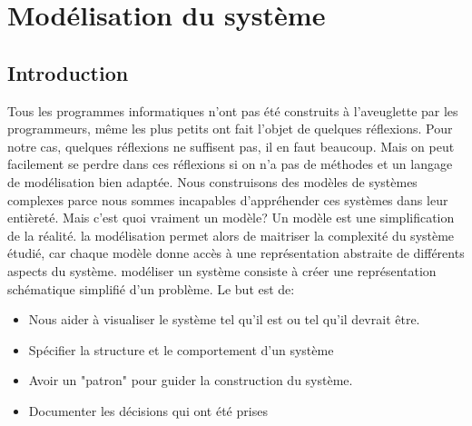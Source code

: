 \chapter{Modélisation  du système}
\minitoc
\newpage
\section{Introduction}
Tous les programmes informatiques n’ont pas été construits à l’aveuglette par les
programmeurs, même les plus petits ont fait l’objet de quelques réflexions. Pour notre cas,
quelques réflexions ne suffisent pas, il en faut beaucoup. Mais on peut facilement se perdre
dans ces réflexions si on n’a pas de méthodes et un langage de modélisation bien adaptée. Nous construisons des modèles de systèmes complexes parce nous sommes incapables d'appréhender ces systèmes dans leur entièreté.
 Mais c'est quoi vraiment  un modèle?
\medskip
	  Un modèle est une simplification de
	  la réalité. la modélisation permet alors de maitriser
	  la complexité du système étudié,
	  car chaque modèle donne accès à
	  une représentation abstraite de
	  différents aspects du système.
	modéliser un système   consiste à créer une représentation schématique simplifié d'un problème. Le but est de:
	\begin{itemize}
\item Nous aider à visualiser le système tel qu'il est ou tel qu'il devrait être.
\item Spécifier la structure et le comportement d'un système
\item Avoir un "patron" pour guider la construction du système.
\item Documenter les décisions qui ont été prises
	\end{itemize}
	

	
	
	
	
	
	
	
	
	
	
	
	
	
	
	
	
